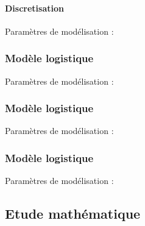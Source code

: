 \documentclass{article}
\begin{document}
\paragraph{}

\paragraph{Discretisation}
\begin{center}
\end{center}
Paramètres de modélisation : 
\paragraph{}

\subsubsection{Modèle logistique}
\begin{center}
\end{center}
Paramètres de modélisation :
\paragraph{}

\subsubsection{Modèle logistique}
\begin{center}
\end{center}
Paramètres de modélisation : 
\paragraph{}

\subsubsection{Modèle logistique}
\begin{center}
\end{center}
Paramètres de modélisation : 
\paragraph{}

\subsection{Etude mathématique}
\end{document}
